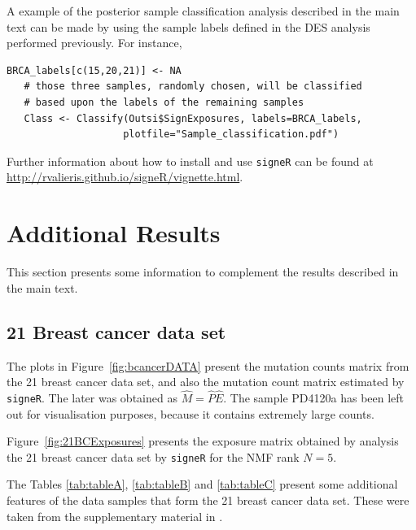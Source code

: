 \documentclass[11pt]{amsart}
\theoremstyle{definition}
\begin{document}
A example of the posterior sample classification analysis described in
the main text can be made by using the sample labels defined in the
DES analysis performed previously. For instance,
\begin{lstlisting}[]
   BRCA_labels[c(15,20,21)] <- NA 
   # those three samples, randomly chosen, will be classified
   # based upon the labels of the remaining samples
   Class <- Classify(Outsi$SignExposures, labels=BRCA_labels,
                    plotfile="Sample_classification.pdf")
\end{lstlisting}
Further information about how to install and use \texttt{signeR} can
be found at \\ \url{http://rvalieris.github.io/signeR/vignette.html}.

\section{Additional Results}
This section presents some information to complement the results
described in the main text. 

\subsection{21 Breast cancer data set}
The plots in Figure~\ref{fig:bcancerDATA} present the mutation
counts matrix from the 21 breast cancer data set, and also the
mutation count matrix estimated by \texttt{signeR}. The later was
obtained as $\widehat M = \widehat P\widehat E$. The sample
PD4120a has been left out for visualisation purposes, because it
contains extremely large counts.


Figure~\ref{fig:21BCExposures} presents the exposure matrix obtained
by analysis the 21 breast cancer data set by \texttt{signeR} for the
NMF rank $N=5$.


The Tables \ref{tab:tableA}, \ref{tab:tableB} and \ref{tab:tableC}
present some additional features of the data samples that form the 21
breast cancer data set. These were taken from the supplementary
material in \cite{NCellFull}. 
\end{document}
